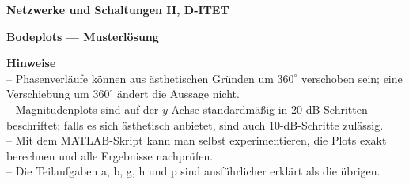 \documentclass[a4paper,12pt]{article}
\begin{document}
\begin{titlepage}
\thispagestyle{firstpage}
\vspace*{4cm}
\begin{center}
{\Large\bfseries Netzwerke und Schaltungen II, D-ITET\par}
\vspace{3mm}
{\Huge\bfseries Bodeplots — Musterlösung\par}
\vspace{9mm}
\end{center}
\vfill
\begingroup\footnotesize
\textbf{Hinweise}\\[2pt]
– Phasenverläufe können aus ästhetischen Gründen um $360^\circ$ verschoben sein; eine Verschiebung um $360^\circ$ ändert die Aussage nicht.\\
– Magnitudenplots sind auf der $y$-Achse standardmäßig in 20-dB-Schritten beschriftet; falls es sich ästhetisch anbietet, sind auch 10-dB-Schritte zulässig.\\
– Mit dem MATLAB-Skript kann man selbst experimentieren, die Plots exakt berechnen und alle Ergebnisse nachprüfen.\\
– Die Teilaufgaben a, b, g, h und p  sind ausführlicher erklärt als die übrigen.
\endgroup
\vfill
\end{titlepage}








 













\end{document}
